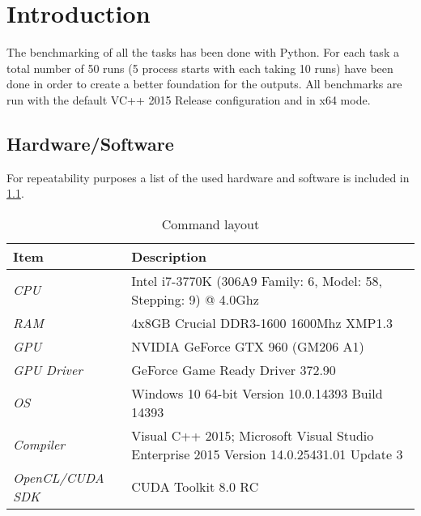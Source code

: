 \documentclass[final]{report}
\begin{document}
\chapter{Introduction}
The benchmarking of all the tasks has been done with Python.
For each task a total number of 50 runs (5 process starts with each taking 10 runs) have been done in order to create a better foundation for the outputs.
All benchmarks are run with the default VC++ 2015 Release configuration and in x64 mode.

\section{Hardware/Software}
For repeatability purposes a list of the used hardware and software is included in \cref{tab:hardware-software}.

\begin{table}[H]
\centering
\caption{Command layout}
\label{tab:hardware-software}
\begin{tabular}{lp{9cm}}
\toprule
\textbf{Item} & \textbf{Description} \\
\midrule
\textit{CPU} & Intel i7-3770K (306A9 Family: 6, Model: 58, Stepping: 9) @ 4.0Ghz\\
\textit{RAM} & 4x8GB Crucial DDR3-1600 1600Mhz XMP1.3\\
\textit{GPU} & NVIDIA GeForce GTX 960 (GM206 A1)\\
\textit{GPU Driver} & GeForce Game Ready Driver 372.90\\
\textit{OS} & Windows 10 64-bit Version 10.0.14393 Build 14393\\
\textit{Compiler} & Visual C++ 2015; Microsoft Visual Studio Enterprise 2015 Version 14.0.25431.01 Update 3\\
\textit{OpenCL/CUDA SDK} & CUDA Toolkit 8.0 RC\\
\bottomrule
\end{tabular}
\end{table}
\end{document}
